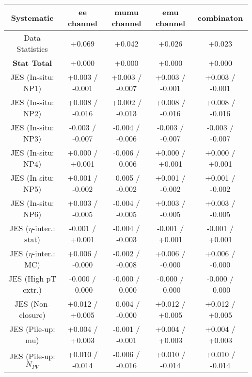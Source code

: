 \begin{table}[htbp]
\scriptsize
  \begin{center} 
  \begin{tabular}{|c|c|c|c|c|}
  \hline
Systematic                            &  ee channel&  mumu channel&  emu channel&  combinaton\\
  \hline
Data Statistics                       &+0.069              & +0.042              & +0.026              & +0.023             \\
\hline
\textbf{Stat Total}                   &+0.000              & +0.000              & +0.000              & +0.000             \\
\hline
JES (In-situ: NP1)                    &+0.003   / -0.001   & +0.003   / -0.007   & +0.003   / -0.001   & +0.003   / -0.001  \\
JES (In-situ: NP2)                    &+0.008   / -0.016   & +0.002   / -0.013   & +0.008   / -0.016   & +0.008   / -0.016  \\
JES (In-situ: NP3)                    &-0.003   / -0.007   & -0.004   / -0.006   & -0.003   / -0.007   & -0.003   / -0.007  \\
JES (In-situ: NP4)                    &+0.000   / +0.001   & -0.006   / -0.006   & +0.000   / +0.001   & +0.000   / +0.001  \\
JES (In-situ: NP5)                    &+0.001   / -0.002   & -0.005   / -0.002   & +0.001   / -0.002   & +0.001   / -0.002  \\
JES (In-situ: NP6)                    &+0.003   / -0.005   & -0.004   / -0.005   & +0.003   / -0.005   & +0.003   / -0.005  \\
JES ($\eta$-inter.: stat)               &-0.001   / +0.001   & -0.004   / -0.003   & -0.001   / +0.001   & -0.001   / +0.001  \\
JES ($\eta$-inter.: MC)                 &+0.006   / -0.000   & -0.002   / -0.008   & +0.006   / -0.000   & +0.006   / -0.000  \\
JES (High pT extr.)                  &-0.000   / -0.000   & -0.000   / -0.000   & -0.000   / -0.000   & -0.000   / -0.000  \\
JES (Non-closure)                     &+0.012   / +0.005   & -0.004   / -0.000   & +0.012   / +0.005   & +0.012   / +0.005  \\
JES (Pile-up: mu)                     &+0.004   / +0.003   & -0.001   / -0.001   & +0.004   / +0.003   & +0.004   / +0.003  \\
JES (Pile-up: $N_{PV}$                  &+0.010   / -0.014   & -0.006   / -0.016   & +0.010   / -0.014   & +0.010   / -0.014  \\

\end{tabular}
\end{center}
\end{table}
